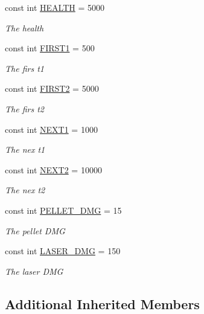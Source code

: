 \begin{DoxyCompactItemize}
\item 
const int \hyperlink{classXaria_1_1Enemies_1_1Boss3_ae252cf99721b91a9030157fed1cfb1e6}{H\+E\+A\+L\+TH} = 5000
\begin{DoxyCompactList}\small\item\em The health \end{DoxyCompactList}\item 
const int \hyperlink{classXaria_1_1Enemies_1_1Boss3_ae55436a2d8e0acd1afa5b7a63acfd1dd}{F\+I\+R\+S\+T1} = 500
\begin{DoxyCompactList}\small\item\em The firs t1 \end{DoxyCompactList}\item 
const int \hyperlink{classXaria_1_1Enemies_1_1Boss3_af6d5108fc9b9a69e96be57bcac13aac5}{F\+I\+R\+S\+T2} = 5000
\begin{DoxyCompactList}\small\item\em The firs t2 \end{DoxyCompactList}\item 
const int \hyperlink{classXaria_1_1Enemies_1_1Boss3_a4ff19b4e6e6e64bd03711341f1b361a8}{N\+E\+X\+T1} = 1000
\begin{DoxyCompactList}\small\item\em The nex t1 \end{DoxyCompactList}\item 
const int \hyperlink{classXaria_1_1Enemies_1_1Boss3_a14e220f0fa6ed81b4f49a7c88507f6df}{N\+E\+X\+T2} = 10000
\begin{DoxyCompactList}\small\item\em The nex t2 \end{DoxyCompactList}\item 
const int \hyperlink{classXaria_1_1Enemies_1_1Boss3_ac9d2f8ba2b641fb7b6b3ffc9970fe82a}{P\+E\+L\+L\+E\+T\+\_\+\+D\+MG} = 15
\begin{DoxyCompactList}\small\item\em The pellet D\+MG \end{DoxyCompactList}\item 
const int \hyperlink{classXaria_1_1Enemies_1_1Boss3_a112fd190d51f3cfa03d80077a53da3af}{L\+A\+S\+E\+R\+\_\+\+D\+MG} = 150
\begin{DoxyCompactList}\small\item\em The laser D\+MG \end{DoxyCompactList}\end{DoxyCompactItemize}
\subsection*{Additional Inherited Members}


